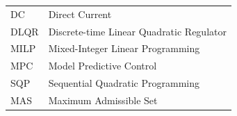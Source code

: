 \begin{longtable}{ll}
DC & Direct Current \\
DLQR & Discrete-time Linear Quadratic Regulator \\
MILP & Mixed-Integer Linear Programming \\
MPC & Model Predictive Control \\
SQP & Sequential Quadratic Programming \\
MAS & Maximum Admissible Set \\

\end{longtable}

